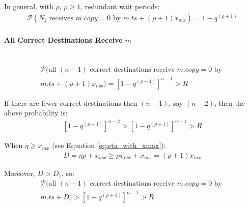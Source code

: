         In general, with $\rho$, $\rho \geq 1$, redundant wait periods:
        \begin{equation}
            \begin{aligned}
                \mathcal{P}(N_j\text{ receives } m.copy = 0 \text{ by } m.ts + (\rho + 1) x_{mx})  = 1 - q^{(\rho+1)}
            \end{aligned}
        \end{equation}
        
        \paragraph{All Correct Destinations Receive $m$}\hfill \\
        \begin{equation}
            \begin{aligned}
                \mathcal{P}(\text{all } (n-1) \text{ correct destinations receive } m.copy = 0 \text{ by } \\ 
                m.ts + (\rho + 1) x_{mx})  = \left[ 1 - q^{(\rho+1)} \right] ^ {n - 1} > R
            \end{aligned}
        \end{equation}
        
        If there are fewer correct destinations then $(n -1)$, say $(n - 2)$, then the above probability is:
        \begin{equation}
            \begin{split}
                \left[ 1 - q^{(\rho+1)} \right] ^ {n - 2} > \left[ 1 - q^{(\rho+1)} \right] ^ {n - 1} > R 
            \end{split}
        \end{equation}
        
        When $\eta \geq x_{mx}$ (see Equation \ref{eq:eta_with_xmax}):
        \begin{equation}
            \begin{aligned}
                D = \eta\rho + x_{mx} \geq \rho x_{mx} + x_{mx} = (\rho + 1) x_{mx}
            \end{aligned}
        \end{equation}
        
        Moreover, $D > D_1$, so:
        \begin{equation}
        \begin{aligned}
                \mathcal{P}(\text{all } (n-1) \text{ correct destinations receive } m.copy = 0 \text{ by } \\
                 m.ts + D)  > \left[ 1 - q^{(\rho+1)} \right] ^ {n - 1} > R
            \end{aligned}
        \end{equation}
                
